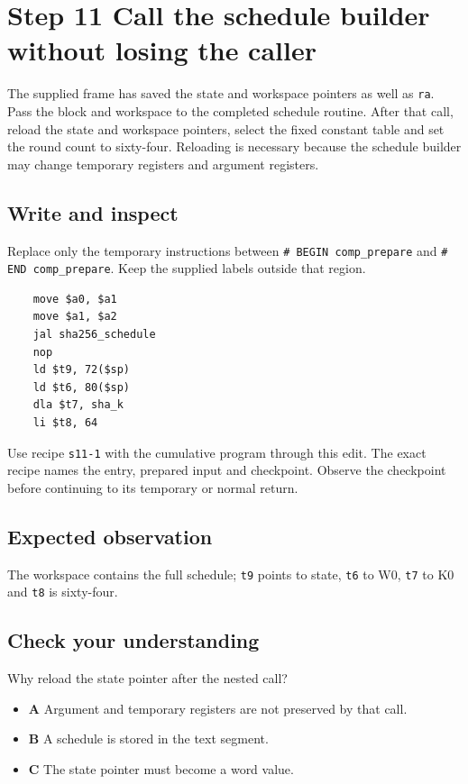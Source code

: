 \section{Step 11 Call the schedule builder without losing the caller}\label{sha-s11}

The supplied frame has saved the state and workspace pointers as well as \texttt{ra}. Pass the block and workspace to the completed schedule routine. After that call, reload the state and workspace pointers, select the fixed constant table and set the round count to sixty-four. Reloading is necessary because the schedule builder may change temporary registers and argument registers.

\subsection{Write and inspect}
Replace only the temporary instructions between \texttt{\# BEGIN comp\_prepare} and \texttt{\# END comp\_prepare}. Keep the supplied labels outside that region.

\begin{verbatim}
    move $a0, $a1
    move $a1, $a2
    jal sha256_schedule
    nop
    ld $t9, 72($sp)
    ld $t6, 80($sp)
    dla $t7, sha_k
    li $t8, 64
\end{verbatim}

Use recipe \texttt{s11-1} with the cumulative program through this edit. The exact recipe names the entry, prepared input and checkpoint. Observe the checkpoint before continuing to its temporary or normal return.

\subsection{Expected observation}
The workspace contains the full schedule; \texttt{t9} points to state, \texttt{t6} to W0, \texttt{t7} to K0 and \texttt{t8} is sixty-four.

\subsection{Check your understanding}
Why reload the state pointer after the nested call?

\begin{itemize}
  \item \textbf{A} Argument and temporary registers are not preserved by that call.
  \item \textbf{B} A schedule is stored in the text segment.
  \item \textbf{C} The state pointer must become a word value.
\end{itemize}
